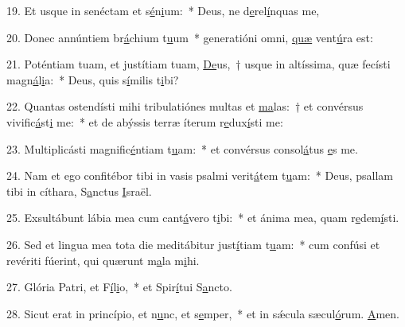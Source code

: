 19. Et usque in senéctam et s\uline{é}n\uline{i}um:~* Deus, ne d\uline{e}rel\uline{í}nquas me,\par 
20. Donec annúntiem br\uline{á}chium t\uline{u}um~* generatióni omni, \uline{quæ} vent\uline{ú}ra est:\par 
21. Poténtiam tuam, et justítiam tuam, \uline{De}us,~† usque in altíssima, quæ fecísti magn\uline{á}l\uline{i}a:~* Deus, quis s\uline{í}milis t\uline{i}bi?\par 
22. Quantas ostendísti mihi tribulatiónes multas et \uline{ma}las:~† et convérsus vivific\uline{á}st\uline{i} me:~* et de abýssis terræ íterum r\uline{e}dux\uline{í}sti me:\par 
23. Multiplicásti magnific\uline{é}ntiam t\uline{u}am:~* et convérsus consol\uline{á}tus \uline{e}s me.\par 
24. Nam et ego confitébor tibi in vasis psalmi verit\uline{á}tem t\uline{u}am:~* Deus, psallam tibi in cíthara, S\uline{a}nctus \uline{I}sraël.\par 
25. Exsultábunt lábia mea cum cant\uline{á}vero t\uline{i}bi:~* et ánima mea, quam r\uline{e}dem\uline{í}sti.\par 
26. Sed et lingua mea tota die meditábitur just\uline{í}tiam t\uline{u}am:~* cum confúsi et revériti fúerint, qui quærunt m\uline{a}la m\uline{i}hi.\par 
27. Glória Patri, et F\uline{í}l\uline{i}o,~* et Spir\uline{í}tui S\uline{a}ncto.\par 
28. Sicut erat in princípio, et n\uline{u}nc, et s\uline{e}mper,~* et in sǽcula sæcul\uline{ó}rum. \uline{A}men.\par 
